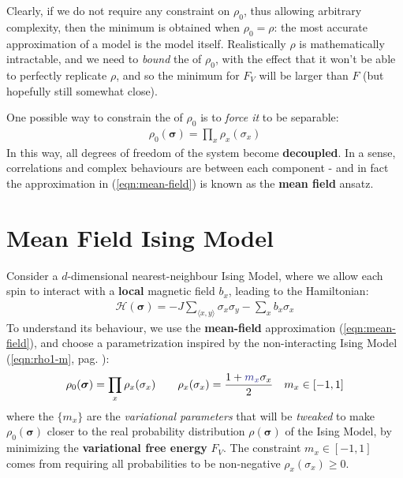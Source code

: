 \documentclass[../template.tex]{subfiles}
\begin{document}
\medskip

Clearly, if we do not require any constraint on $\rho_0$, thus allowing arbitrary complexity, then the minimum is obtained when $\rho_0 = \rho$: the most accurate approximation of a model is the model itself. Realistically $\rho$ is mathematically intractable, and we need to \textit{bound} the  of $\rho_0$, with the effect that it won't be able to perfectly replicate $\rho$, and so the minimum for $F_V$ will be larger than $F$ (but hopefully still somewhat close).

\medskip

One possible way to constrain the  of $\rho_0$ is to \textit{force it} to be separable: 
\begin{align}\label{eqn:mean-field}
    \rho_0(\bm{\sigma}) = \prod_x \rho_x (\sigma_x)
\end{align} 
In this way, all degrees of freedom of the system become \textbf{decoupled}. In a sense, correlations and complex behaviours are  between each component - and in fact the approximation in (\ref{eqn:mean-field}) is known as the \textbf{mean field} ansatz. 

\section{Mean Field Ising Model}
Consider a $d$-dimensional nearest-neighbour Ising Model, where we allow each spin to interact with a \textbf{local} magnetic field $b_x$, leading to the Hamiltonian:
\begin{align*}
    \mathcal{H}(\bm{\sigma}) = -J \sum_{\langle x,y \rangle} \sigma_x \sigma_y - \sum_x b_x \sigma_x
\end{align*}
To understand its behaviour, we use the \textbf{mean-field} approximation (\ref{eqn:mean-field}), and choose a parametrization inspired by the non-interacting Ising Model (\ref{eqn:rho1-m}, pag. \pageref{eqn:rho1-m}):
\begin{align} \label{eqn:mfi}
    \rho_0(\bm{\sigma}) = \prod_x \rho_x(\sigma_x) \qquad \rho_x(\sigma_x) = \frac{1+\textcolor{Blue}{m_x} \sigma_x}{2} \quad m_x \in [-1,1]
\end{align}
where the $\{m_x\}$ are the \textit{variational parameters} that will be \textit{tweaked} to make $\rho_0(\bm{\sigma})$ closer to the real probability distribution $\rho(\bm{\sigma})$ of the Ising Model, by minimizing the \textbf{variational free energy} $F_V$. The constraint $m_x \in [-1,1]$ comes from requiring all probabilities to be non-negative $\rho_x(\sigma_x) \geq 0$.
\end{document}
